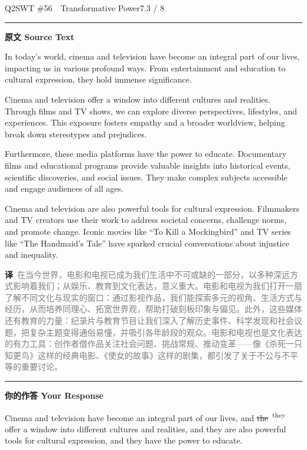 \documentclass[11pt]{article}
\newcommand{\fix}[2]{%
  \colorbox{cWrongBg}{\textcolor{cWrong}{\sout{#1}}}%
  \,\textsuperscript{\textcolor{cFix}{\footnotesize #2}}}
\newcommand{\ptesub}[1]{%
  \par\needspace{2\baselineskip}\smallskip
  {\color{cAccent}\rule[-0.2ex]{3pt}{1.05em}}\hspace{6pt}%
  {\bfseries\color{cHead}#1}\par\nopagebreak\smallskip}
\newcommand{\zh}[1]{{\footnotesize\textcolor{cNote}{\textbf{译}}\ \textcolor{gray}{#1}}}
\begin{document}
\begin{qblock}{Q2\quad SWT \#56\ \ Transformative Power}{7.3 / 8}

\ptesub{原文 Source Text}
\begin{promptbox}
In today's world, cinema and television have become an integral part of our lives, impacting us in various profound ways. From entertainment and education to cultural expression, they hold immense significance.

Cinema and television offer a window into different cultures and realities. Through films and TV shows, we can explore diverse perspectives, lifestyles, and experiences. This exposure fosters empathy and a broader worldview, helping break down stereotypes and prejudices.

Furthermore, these media platforms have the power to educate. Documentary films and educational programs provide valuable insights into historical events, scientific discoveries, and social issues. They make complex subjects accessible and engage audiences of all ages.

Cinema and television are also powerful tools for cultural expression. Filmmakers and TV creators use their work to address societal concerns, challenge norms, and promote change. Iconic movies like ``To Kill a Mockingbird'' and TV series like ``The Handmaid's Tale'' have sparked crucial conversations about injustice and inequality.
\end{promptbox}
\zh{在当今世界，电影和电视已成为我们生活中不可或缺的一部分，以多种深远方式影响着我们；从娱乐、教育到文化表达，意义重大。电影和电视为我们打开一扇了解不同文化与现实的窗口：通过影视作品，我们能探索多元的视角、生活方式与经历，从而培养同理心、拓宽世界观，帮助打破刻板印象与偏见。此外，这些媒体还有教育的力量：纪录片与教育节目让我们深入了解历史事件、科学发现和社会议题，把复杂主题变得通俗易懂，并吸引各年龄段的观众。电影和电视也是文化表达的有力工具：创作者借作品关注社会问题、挑战常规、推动变革——像《杀死一只知更鸟》这样的经典电影、《使女的故事》这样的剧集，都引发了关于不公与不平等的重要讨论。}

\ptesub{你的作答 Your Response}
\begin{youbox}
Cinema and television have become an integral part of our lives, and \fix{the}{they} offer a window into different cultures and realities, and they are also powerful tools for cultural expression, and they have the power to educate.
\end{youbox}


\end{qblock}
\end{document}
